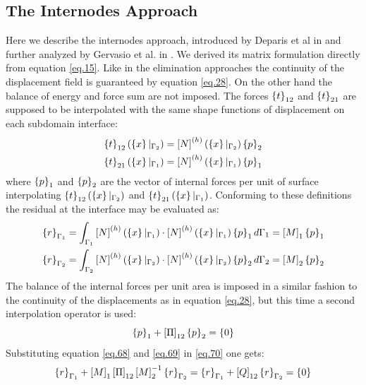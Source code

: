 \subsection{The Internodes Approach}\label{ssec35}
Here we describe the internodes approach, introduced by Deparis et al in \cite{deparis2016internodes} and further analyzed by Gervasio et al. in \cite{gervasio2016analysis}. We derived its matrix formulation directly from equation \eqref{eq.15}. Like in the elimination approaches the continuity of the displacement field is guaranteed by equation \eqref{eq.28}. On the other hand the balance of energy and force sum are not imposed. The forces $\left\lbrace{t}\right \rbrace_{12}$ and $\left\lbrace{t}\right \rbrace_{21}$ are supposed to be interpolated with the same shape functions of displacement  on each subdomain interface:
\begin{eqnarray}
\label{eq.66}
 \left\lbrace{t}\right \rbrace_{12}(\left\lbrace{x}\right \rbrace|_{\Gamma_2})=\left[{N}\right]^{(h)}(\left\lbrace{x}\right \rbrace|_{\Gamma_2}) \left\lbrace{p}\right \rbrace_{2}\\
 \label{eq.67}
 \left\lbrace{t}\right \rbrace_{21}(\left\lbrace{x}\right \rbrace|_{\Gamma_1})=\left[{N}\right]^{(h)}(\left\lbrace{x}\right \rbrace|_{\Gamma_1}) \left\lbrace{p}\right \rbrace_{1}
\end{eqnarray}
where $\left\lbrace{p}\right \rbrace_{1}$ and $\left\lbrace{p}\right \rbrace_{2}$ are the vector of internal forces per unit of surface interpolating $\left\lbrace{t}\right \rbrace_{12}(\left\lbrace{x}\right \rbrace|_{\Gamma_2})$ and $ \left\lbrace{t}\right \rbrace_{21}(\left\lbrace{x}\right \rbrace|_{\Gamma_1})$.
Conforming to these definitions the residual at the interface may be evaluated as:
\begin{eqnarray}
\label{eq.68}
 \left\lbrace{r}\right \rbrace_{\Gamma_1}=\int_{\Gamma_1}\left[{N}\right]^{(h)}(\left\lbrace{x}\right \rbrace|_{\Gamma_1})\cdot\left[{N}\right]^{(h)}(\left\lbrace{x}\right \rbrace|_{\Gamma_1}) \left\lbrace{p}\right \rbrace_{1}d\Gamma_1=\left[{M}\right]_1\left\lbrace{p}\right \rbrace_{1}\\
 \label{eq.69}
\left\lbrace{r}\right \rbrace_{\Gamma_2}=\int_{\Gamma_2}\left[{N}\right]^{(h)}(\left\lbrace{x}\right \rbrace|_{\Gamma_2})\cdot\left[{N}\right]^{(h)}(\left\lbrace{x}\right \rbrace|_{\Gamma_2}) \left\lbrace{p}\right \rbrace_{2}d\Gamma_2=\left[{M}\right]_2\left\lbrace{p}\right \rbrace_{2}
\end{eqnarray}
The balance of the internal forces per unit area is imposed in a similar fashion to the continuity of the displacements as in equation \eqref{eq.28}, but this time a second interpolation operator is used:
\begin{equation}
\label{eq.70}
\left\lbrace{p}\right \rbrace_{1}+\left[{\Pi}\right]_{12}\left\lbrace{p}\right \rbrace_{2}=\left\lbrace{0}\right \rbrace
\end{equation}
Substituting equation \eqref{eq.68} and \eqref{eq.69} in \eqref{eq.70} one gets:
\begin{equation}
\label{eq.71}
\left\lbrace{r}\right \rbrace_{\Gamma_1}+\left[{M}\right]_1\left[{\Pi}\right]_{12}\left[{M}\right]_2^{-1}\left\lbrace{r}\right \rbrace_{\Gamma_2}=\left\lbrace{r}\right \rbrace_{\Gamma_1}+\left[{Q}\right]_{12}\left\lbrace{r}\right \rbrace_{\Gamma_2}=\left\lbrace{0}\right \rbrace
\end{equation}
